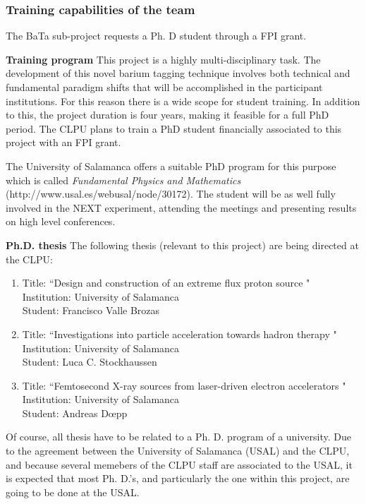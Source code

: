 
\subsubsection*{Training capabilities of the team}

The BaTa sub-project requests a Ph. D student through a FPI grant.

{\bf Training program}
This project is a highly multi-disciplinary task. The development of this novel barium tagging technique involves both technical and fundamental paradigm shifts that will be accomplished in the participant institutions. For this reason there is a wide scope for student training. In addition to this, the project duration is four years, making it feasible for a  full PhD period. The CLPU plans to train a PhD student financially associated to this project with an FPI grant. 

The University of Salamanca offers a suitable PhD program for this purpose which is called \emph{Fundamental Physics and Mathematics} (http://www.usal.es/webusal/node/30172). The student will be as well fully involved in the NEXT experiment, attending the meetings and presenting results on high level conferences.

{\bf Ph.D. thesis}
The following thesis (relevant to this project) are being directed at the CLPU:

\begin{enumerate}

\item Title: ``Design and construction of an extreme flux proton source "\\
Institution: University of Salamanca\\
Student: Francisco Valle Brozas\\


\item Title: ``Investigations into particle acceleration towards hadron therapy "\\
Institution: University of Salamanca\\
Student: Luca C. Stockhaussen\\


\item Title: ``Femtosecond X-ray sources from laser-driven electron accelerators "\\
Institution: University of Salamanca\\
Student: Andreas D{\oe}pp\\

\end{enumerate}

Of course, all thesis have to be related to a Ph. D. program  of a university. Due to the agreement between the University of Salamanca (USAL) and the CLPU, and because several memebers of the CLPU staff are associated to the USAL, it is expected that most Ph. D.'s, and particularly the one within this project, are going to be done at the USAL.

